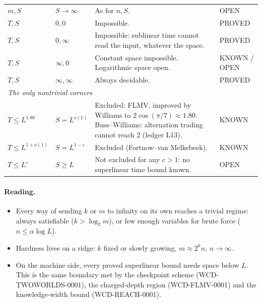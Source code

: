 \documentclass[11pt]{article}
\begin{document}
\begin{longtable}{p{2.1cm}p{1.6cm}p{8.6cm}p{2.3cm}}
$m,S$ & $S\to\infty$ & As for $n,S$. & OPEN\\
$T,S$ & $0,0$ & Impossible. & PROVED\\
$T,S$ & $0,\infty$ & Impossible: sublinear time cannot read the input, whatever the space. & PROVED\\
$T,S$ & $\infty,0$ & Constant space impossible. Logarithmic space open. & KNOWN / OPEN\\
$T,S$ & $\infty,\infty$ & Always decidable. & PROVED\\\midrule
\multicolumn{4}{l}{\emph{The only nontrivial corners}}\\
$T\le L^{1.80}$ & $S=L^{o(1)}$ & Excluded: FLMV, improved by Williams to $2\cos(\pi/7)\approx1.80$. Buss--Williams: alternation trading cannot reach 2 (ledger L13). & KNOWN\\
$T\le L^{1+o(1)}$ & $S=L^{1-\varepsilon}$ & Excluded (Fortnow--van Melkebeek). & KNOWN\\
$T\le L^{c}$ & $S\ge L$ & Not excluded for any $c>1$: no superlinear time bound known. & OPEN\\
\bottomrule
\end{longtable}

\paragraph{Reading.}
\begin{itemize}
\item Every way of sending $k$ or $m$ to infinity on its own reaches a trivial regime: always satisfiable ($k>\log_2m$), or few enough variables for brute force ($n\le\alpha\log L$).
\item Hardness lives on a ridge: $k$ fixed or slowly growing, $m\approx2^{k}n$, $n\to\infty$.
\item On the machine side, every proved superlinear bound needs space below $L$. This is the same boundary met by the checkpoint scheme (WCD-TWOWORLDS-0001), the charged-depth region (WCD-FLMV-0001) and the knowledge-width bound (WCD-REACH-0001).
\end{itemize}
\end{document}

